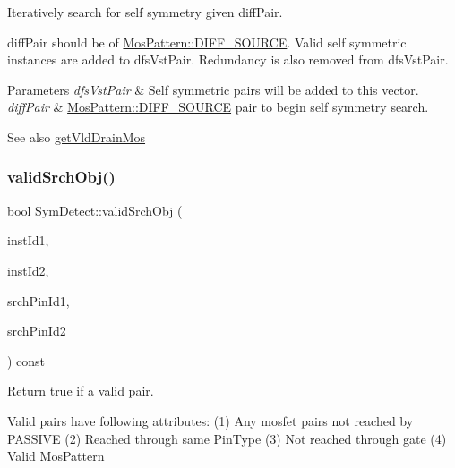 Iteratively search for self symmetry given diff\+Pair. 

diff\+Pair should be of \hyperlink{type_8h_af19eddb079bfea723256710b029c38e8ad45b64a7d6b85dde1b52dd5a18863933}{Mos\+Pattern\+::\+D\+I\+F\+F\+\_\+\+S\+O\+U\+R\+CE}. Valid self symmetric instances are added to dfs\+Vst\+Pair. Redundancy is also removed from dfs\+Vst\+Pair.


\begin{DoxyParams}{Parameters}
{\em dfs\+Vst\+Pair} & Self symmetric pairs will be added to this vector. \\
\hline
{\em diff\+Pair} & \hyperlink{type_8h_af19eddb079bfea723256710b029c38e8ad45b64a7d6b85dde1b52dd5a18863933}{Mos\+Pattern\+::\+D\+I\+F\+F\+\_\+\+S\+O\+U\+R\+CE} pair to begin self symmetry search.\\
\hline
\end{DoxyParams}
\begin{DoxySeeAlso}{See also}
\hyperlink{classSymDetect_a48c23173bf5e56c3aa11ac306715cba2}{get\+Vld\+Drain\+Mos} 
\end{DoxySeeAlso}
\mbox{\label{classSymDetect_ad4636f69ae0cad2fc23be2472c59ff4c}} 
\subsubsection{\texorpdfstring{valid\+Srch\+Obj()}{validSrchObj()}}
{\footnotesize\ttfamily bool Sym\+Detect\+::valid\+Srch\+Obj (\begin{DoxyParamCaption}\item[{\hyperlink{type_8h_a581e8093e28e7362f2b6937296190676}{Index\+Type}}]{inst\+Id1,  }\item[{\hyperlink{type_8h_a581e8093e28e7362f2b6937296190676}{Index\+Type}}]{inst\+Id2,  }\item[{\hyperlink{type_8h_a581e8093e28e7362f2b6937296190676}{Index\+Type}}]{srch\+Pin\+Id1,  }\item[{\hyperlink{type_8h_a581e8093e28e7362f2b6937296190676}{Index\+Type}}]{srch\+Pin\+Id2 }\end{DoxyParamCaption}) const\hspace{0.3cm}{\ttfamily [private]}}



Return true if a valid pair. 

Valid pairs have following attributes\+: (1) Any mosfet pairs not reached by P\+A\+S\+S\+I\+VE (2) Reached through same Pin\+Type (3) Not reached through gate (4) Valid Mos\+Pattern


